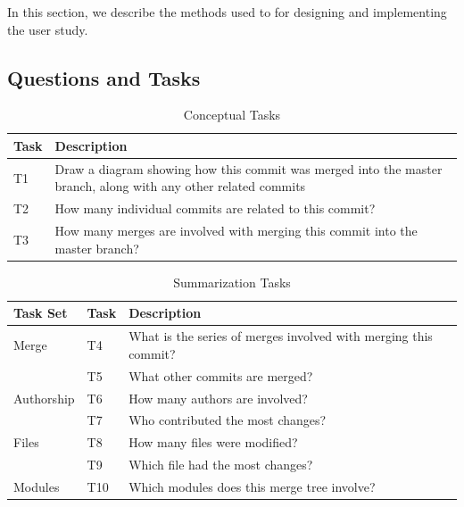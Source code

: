 \documentclass[draft]{IEEEtran}
\begin{document}
In this section, we describe the methods used to for designing and
implementing the user study.


\subsection{Questions and Tasks}
\label{sub:questions}



\begin{table}[htpb]
  \centering
  \caption{Conceptual Tasks }
  \label{tab:conceptual_tasks}
  \begin{tabulary}{0.9\textwidth}{LL}
    \toprule
    Task & Description\\
    \midrule
    T1 & Draw a diagram showing how this commit was merged into the master branch, along with any other related commits\\
    T2 & How many individual commits are related to this commit?\\
    T3 & How many merges are involved with merging this commit into the master branch?\\
    \bottomrule
  \end{tabulary}
\end{table}

\begin{table}[htpb]
  \centering
  \caption{Summarization Tasks}
  \label{tab:summarization_tasks}
  \begin{tabulary}{\linewidth}{LLL}
    \toprule
    Task Set   & Task & Description\\\midrule
    Merge      & T4   & What is the series of merges involved with merging this
    commit?\\
               & T5   & What other commits are merged?\\
    Authorship & T6   & How many authors are involved?\\
               & T7   & Who contributed the most changes?\\
    Files      & T8   & How many files were modified?\\
               & T9   & Which file had the most changes?\\
    Modules    & T10  & Which modules does this merge tree involve?\\
    \bottomrule
  \end{tabulary}
\end{table}
\end{document}
